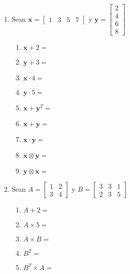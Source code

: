 \documentclass[spanish, 10pt]{article}
\begin{document}
\begin{enumerate}
    \itemsep2.5ex
    \item Sean $\mathbf{x} =\begin{bmatrix}
        1 & 3 & 5 & 7
    \end{bmatrix}$ \quad y \quad
    $\mathbf{y} = \begin{bmatrix}
        2 \\
        4 \\
        6 \\
        8
    \end{bmatrix}$

        \bigskip

    \begin{enumerate}
        \item $\mathbf{x} + 2 =$
        \item $\mathbf{y} + 3 =$
        \item $\mathbf{x} \cdot 4 =$
        \item $\mathbf{y}  \cdot 5 =$
        \item $\mathbf{x} + \mathbf{y}^T =$
        \item $\mathbf{x} + \mathbf{y} =$
        \item $\mathbf{x} \cdot \mathbf{y} =$
        \item $\mathbf{x} \otimes \mathbf{y} =$
        \item $\mathbf{y} \otimes \mathbf{x} =$
    \end{enumerate}

    \item Sean $ A = \begin{bmatrix}
        1 & 2\\
        3 & 4
    \end{bmatrix}$ \quad y
    $B = \begin{bmatrix}
        3 & 3 & 1\\
        2 & 3 & 5
    \end{bmatrix}$
    
    \bigskip

    \begin{enumerate}
        \item $A + 2 =$
        \item $A \times 5 =$
        \item $A \times B =$
        \item $B^T = $
        \item $B^T \times A = $
    \end{enumerate}
\end{enumerate}
\end{document}
